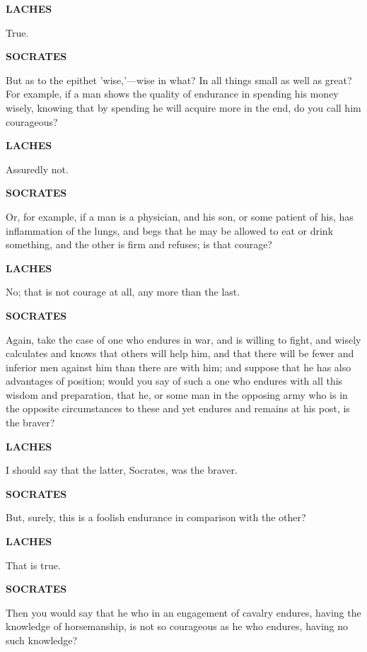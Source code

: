\documentclass[11pt,letter]{article}
\begin{document}
\par \textbf{LACHES}
\par   True.

\par \textbf{SOCRATES}
\par   But as to the epithet 'wise,'—wise in what? In all things small as well as great? For example, if a man shows the quality of endurance in spending his money wisely, knowing that by spending he will acquire more in the end, do you call him courageous?

\par \textbf{LACHES}
\par   Assuredly not.

\par \textbf{SOCRATES}
\par   Or, for example, if a man is a physician, and his son, or some patient of his, has inflammation of the lungs, and begs that he may be allowed to eat or drink something, and the other is firm and refuses; is that courage?

\par \textbf{LACHES}
\par   No; that is not courage at all, any more than the last.

\par \textbf{SOCRATES}
\par   Again, take the case of one who endures in war, and is willing to fight, and wisely calculates and knows that others will help him, and that there will be fewer and inferior men against him than there are with him; and suppose that he has also advantages of position; would you say of such a one who endures with all this wisdom and preparation, that he, or some man in the opposing army who is in the opposite circumstances to these and yet endures and remains at his post, is the braver?

\par \textbf{LACHES}
\par   I should say that the latter, Socrates, was the braver.

\par \textbf{SOCRATES}
\par   But, surely, this is a foolish endurance in comparison with the other?

\par \textbf{LACHES}
\par   That is true.

\par \textbf{SOCRATES}
\par   Then you would say that he who in an engagement of cavalry endures, having the knowledge of horsemanship, is not so courageous as he who endures, having no such knowledge?
\end{document}
